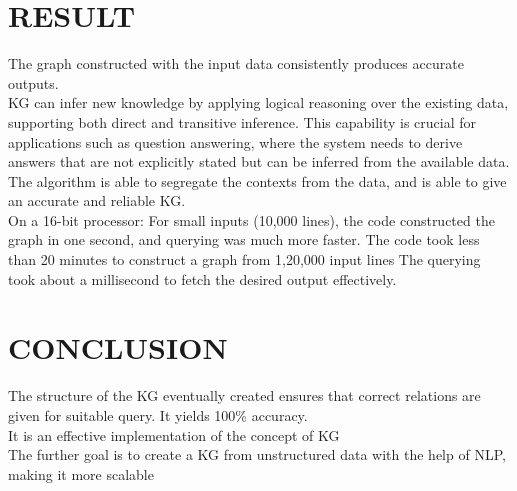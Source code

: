 \documentclass[conference]{IEEEtran}
\begin{document}
\section*{RESULT}
The graph constructed with the input data consistently produces accurate outputs.
\\
KG can infer new knowledge by applying logical reasoning over the existing data, supporting both direct and transitive inference. This capability is crucial for applications such as question answering, where the system needs to derive answers that are not explicitly stated but can be inferred from the available data.
\\
The algorithm is able to segregate the contexts from the data, and is able to give an accurate and reliable KG.
\\
On a 16-bit processor:
For small inputs (10,000 lines), the code constructed the graph in one second, and querying was much more faster.
The code took less than 20 minutes to construct a graph from 1,20,000 input lines 
The querying took about a millisecond to fetch the desired output effectively.

\section*{CONCLUSION}
The structure of the KG eventually created ensures that correct relations are given for suitable query. It yields 100\% accuracy.
\\
It is an effective implementation of the concept of KG
\\
The further goal is to create a KG from unstructured data with the help of NLP, making it more scalable
\end{document}
